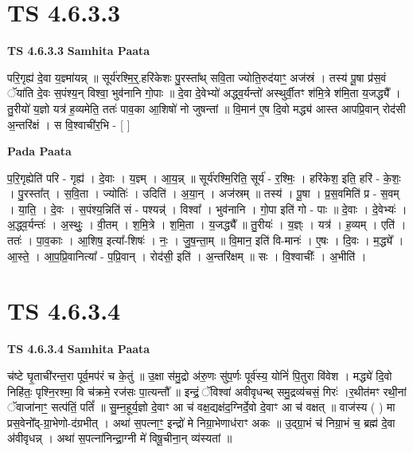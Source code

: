 \documentclass[17pt]{extarticle}
\begin{document}

\section{ TS 4.6.3.3 }

\textbf{TS 4.6.3.3 } \newline
\textbf{Samhita Paata} \newline

परि॒गृह्य॑ दे॒वा य॒ज्ञ्मा॑यन्न् ॥ सूर्य॑रश्मि॒र्॒.हरि॑केशः पु॒रस्ता᳚थ् सवि॒ता ज्योति॒रुद॑याꣳ॒॒ अज॑स्रं । तस्य॑ पू॒षा प्र॑स॒वं ॅया॑ति दे॒वः स॒पंश्य॒न् विश्वा॒ भुव॑नानि गो॒पाः ॥ दे॒वा दे॒वेभ्यो॑ अद्ध्व॒र्यन्तो॑ अस्थुर्वी॒तꣳ श॑मि॒त्रे श॑मि॒ता य॒जद्ध्यै᳚ । तु॒रीयो॑ य॒ज्ञो यत्र॑ ह॒व्यमेति॒ ततः॑ पाव॒का आ॒शिषो॑ नो जुषन्तां ॥ वि॒मान॑ ए॒ष दि॒वो मद्ध्य॑ आस्त आपप्रि॒वान् रोद॑सी अ॒न्तरि॑क्षं । स वि॒श्वाची॑र॒भि - [  ] \newline

\textbf{Pada Paata} \newline

प॒रि॒गृह्येति॑ परि - गृह्य॑ । दे॒वाः । य॒ज्ञ्म् । आ॒य॒न्न् ॥ सूर्य॑रश्मि॒रिति॒ सूर्य॑ - र॒श्मिः॒ । हरि॑केश॒ इति॒ हरि॑ - के॒शः॒ । पु॒रस्ता᳚त् । स॒वि॒ता । ज्योतिः॑ । उदिति॑ । अ॒या॒न् । अज॑स्रम् ॥ तस्य॑ । पू॒षा । प्र॒स॒वमिति॑ प्र - स॒वम् । या॒ति॒ । दे॒वः । स॒पंश्य॒न्निति॑ सं - पश्यन्न्॑ । विश्वा᳚ । भुव॑नानि । गो॒पा इति॑ गो - पाः ॥ दे॒वाः । दे॒वेभ्यः॑ । अ॒द्ध्व॒र्यन्तः॑ । अ॒स्थुः॒ । वी॒तम् । श॒मि॒त्रे । श॒मि॒ता । य॒जद्ध्यै᳚ ॥ तु॒रीयः॑ । य॒ज्ञ्ः । यत्र॑ । ह॒व्यम् । एति॑ । ततः॑ । पा॒व॒काः । आ॒शिष॒ इत्या᳚-शिषः॑ । नः॒ । जु॒ष॒न्ता॒म् ॥ वि॒मान॒ इति॑ वि-मानः॑ । ए॒षः । दि॒वः । म॒द्ध्ये᳚ । आ॒स्ते॒ । आ॒प॒प्रि॒वानित्या᳚ - प॒प्रि॒वान् । रोद॑सी॒ इति॑ । अ॒न्तरि॑क्षम् ॥ सः । वि॒श्वाचीः᳚ । अ॒भीति॑ ।  \newline





\section{ TS 4.6.3.4 }

\textbf{TS 4.6.3.4 } \newline
\textbf{Samhita Paata} \newline

च॑ष्टे घृ॒ताची॑रन्त॒रा पूर्व॒मप॑रं च के॒तुं ॥ उ॒क्षा स॑मु॒द्रो अ॑रु॒णः सु॑प॒र्णः पूर्व॑स्य॒ योनिं॑ पि॒तुरा वि॑वेश । मद्ध्ये॑ दि॒वो निहि॑तः॒ पृश्नि॒रश्मा॒ वि च॑क्रमे॒ रज॑सः पा॒त्यन्तौ᳚ ॥ इन्द्रं॒ ॅविश्वा॑ अवीवृधन्थ् समु॒द्रव्य॑चसं॒ गिरः॑ ।र॒थीत॑मꣳ रथी॒नां ॅवाजा॑नाꣳ॒॒ सत्प॑तिं॒ पतिं᳚ ॥ सु॒म्न॒हूर्य॒ज्ञो दे॒वाꣳ आ च॑ वक्ष॒द्यक्ष॑द॒ग्निर्दे॒वो दे॒वाꣳ आ च॑ वक्षत् ॥ वाज॑स्य ( ) मा प्रस॒वेनो᳚द्-ग्रा॒भेणो-द॑ग्रभीत् । अथा॑ स॒पत्नाꣳ॒॒ इन्द्रो॑ मे निग्रा॒भेणाध॑राꣳ अकः ॥ उ॒द्ग्रा॒भं च॑ निग्रा॒भं च॒ ब्रह्म॑ दे॒वा अ॑वीवृधन्न् । अथा॑ स॒पत्ना॑निन्द्रा॒ग्नी मे॑ विषू॒चीना॒न् व्य॑स्यतां ॥ \newline
\end{document}
